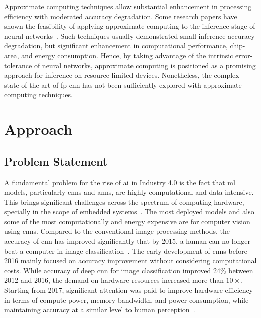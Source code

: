 Approximate computing techniques allow substantial enhancement in processing efficiency with moderated accuracy degradation. Some research papers have shown the feasibility of applying approximate computing to the inference stage of neural networks~\cite{lotrivc2012applicability, han2013approximate, du2014leveraging, mrazek2016design, sarwar2016multiplier, zervakis2021approximate}. Such techniques usually demonstrated small inference accuracy degradation, but significant enhancement in computational performance, chip-area, and energy consumption. Hence, by taking advantage of the intrinsic error-tolerance of neural networks, approximate computing is positioned as a promising approach for inference on resource-limited devices. Nonetheless, the complex state-of-the-art of \gls{fp} \gls{cnn} has not been sufficiently explored with approximate computing techniques.

\section{Approach}
\subsection{Problem Statement}
A fundamental problem for the rise of \gls{ai} in Industry 4.0 is the fact that \gls{ml} models, particularly \glspl{cnn} and \glspl{ann}, are highly computational and data intensive. This brings significant challenges across the spectrum of computing hardware, specially in the scope of embedded systems~\cite{venkataramani2016efficient}. The most deployed models and also some of the most computationally and energy expensive are for computer vision using \glspl{cnn}. Compared to the conventional image processing methods, the accuracy of \gls{cnn} has improved significantly that by 2015, a human can no longer beat a computer in image classification~\cite{loh20201}. The early development of \glspl{cnn} before 2016 mainly focused on accuracy improvement without considering computational costs. While accuracy of deep \gls{cnn} for image classification improved 24\% between 2012 and 2016, the demand on hardware resources increased more than $10\times$. Starting from 2017, significant attention was paid to improve hardware efficiency in terms of compute power, memory bandwidth, and power consumption, while maintaining accuracy at a similar level to human perception~\cite{venkataramani2016efficient}.

